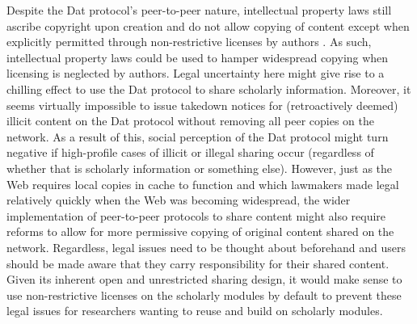 \documentclass[publications,article,submit,moreauthors,pdftex,10pt,a4paper]{Definitions/mdpi}
\begin{document}
Despite the Dat protocol's peer-to-peer nature, intellectual property
laws still ascribe copyright upon creation and do not allow copying of
content except when explicitly permitted through non-restrictive
licenses by authors \citep{isbn:9781400851911}. As such, intellectual
property laws could be used to hamper widespread copying when
licensing is neglected by authors. Legal uncertainty here might give
rise to a chilling effect to use the Dat protocol to share scholarly
information. Moreover, it seems virtually impossible to issue takedown
notices for (retroactively deemed) illicit content on the Dat protocol
without removing all peer copies on the network. As a result of this,
social perception of the Dat protocol might turn negative if
high-profile cases of illicit or illegal sharing occur (regardless of
whether that is scholarly information or something else). However,
just as the Web requires local copies in cache to function and which
lawmakers made legal relatively quickly when the Web was becoming
widespread, the wider implementation of peer-to-peer protocols to
share content might also require reforms to allow for more permissive
copying of original content shared on the network.  Regardless, legal
issues need to be thought about beforehand and users should be made
aware that they carry responsibility for their shared content. Given
its inherent open and unrestricted sharing design, it would make sense
to use non-restrictive licenses on the scholarly modules by default to
prevent these legal issues for researchers wanting to reuse and build
on scholarly modules.
\end{document}
